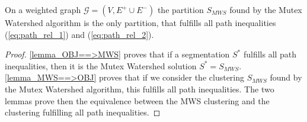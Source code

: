 \begin{theorem} \label{theo:equivalence_OBJ_MWS}
On a weighted graph ${\mathcal{G}=(V,E^{+}\cup E^{-})}$
the partition $S_{MWS}$ found by the Mutex Watershed algorithm is the only partition, that  fulfills all path inequalities (\ref{eq:path_rel_1}) and (\ref{eq:path_rel_2}).
\end{theorem}
\begin{proof}
\autoref{lemma_OBJ==>MWS} proves that if a segmentation $S^*$ fulfills all path inequalities, then it is the Mutex Watershed solution $S^*=S_{MWS}$. \autoref{lemma_MWS==>OBJ} proves that if we consider the clustering $S_{MWS}$ found by the Mutex Watershed algorithm, this fulfills all path inequalities. The two lemmas prove then the equivalence between the MWS clustering and the clustering fulfilling all path inequalities. 

\end{proof}


